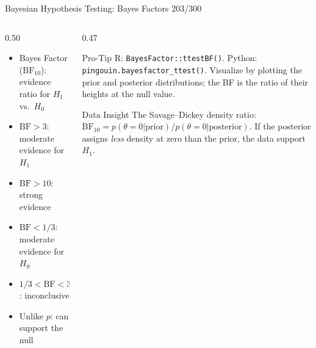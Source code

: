 \documentclass[10pt]{beamer}
\newcommand{\smark}[1]{\hfill{\scriptsize\color{codegray}#1}}
\begin{document}
\begin{frame}{Bayesian Hypothesis Testing: Bayes Factors}
\smark{203/300}
\begin{columns}[T]
\begin{column}{0.50\textwidth}
\begin{itemize}
    \item Bayes Factor ($\text{BF}_{10}$): evidence ratio for $H_1$ vs.\ $H_0$
    \item $\text{BF} > 3$: moderate evidence for $H_1$
    \item $\text{BF} > 10$: strong evidence
    \item $\text{BF} < 1/3$: moderate evidence for $H_0$
    \item $1/3 < \text{BF} < 3$: inconclusive
    \item Unlike $p$: can support the null
\end{itemize}
\end{column}
\begin{column}{0.47\textwidth}
\begin{alertblock}{Pro-Tip}
    \scriptsize R: \texttt{BayesFactor::ttestBF()}. Python: \texttt{pingouin.bayesfactor\_ttest()}. Visualize by plotting the prior and posterior distributions; the BF is the ratio of their heights at the null value.
\end{alertblock}
\vspace{0.1cm}
\begin{exampleblock}{Data Insight}
    \scriptsize The Savage--Dickey density ratio: $\text{BF}_{10} = p(\theta = 0 | \text{prior}) / p(\theta = 0 | \text{posterior})$. If the posterior assigns \emph{less} density at zero than the prior, the data support $H_1$.
\end{exampleblock}
\end{column}
\end{columns}
\end{frame}
\end{document}
